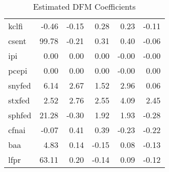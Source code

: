 \documentclass[11pt, letterpaper]{article}\usepackage[]{graphicx}\usepackage[]{color}
\begin{document}
\begin{table}[H]
\begin{tabular}{lrrrrr}
  kclfi & -0.46 & -0.15 & 0.28 & 0.23 & -0.11 \\ 
  csent & 99.78 & -0.21 & 0.31 & 0.40 & -0.06 \\ 
  ipi & 0.00 & 0.00 & 0.00 & -0.00 & -0.00 \\ 
  pcepi & 0.00 & 0.00 & 0.00 & -0.00 & 0.00 \\ 
  snyfed & 6.14 & 2.67 & 1.52 & 2.96 & 0.06 \\ 
  stxfed & 2.52 & 2.76 & 2.55 & 4.09 & 2.45 \\ 
  sphfed & 21.28 & -0.30 & 1.92 & 1.93 & -0.28 \\ 
  cfnai & -0.07 & 0.41 & 0.39 & -0.23 & -0.22 \\ 
  baa & 4.83 & 0.14 & -0.15 & 0.08 & -0.13 \\ 
  lfpr & 63.11 & 0.20 & -0.14 & 0.09 & -0.12 \\ 
   \hline
\end{tabular}
\endgroup
\caption{Estimated DFM Coefficients} 
\end{table}
\end{document}
